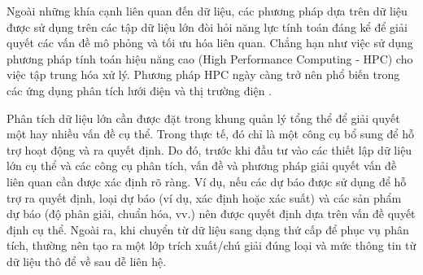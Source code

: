 \documentclass[utf8]{frontiersSCNS} %
\begin{document}
Ngoài những khía cạnh liên quan đến dữ liệu, các phương pháp dựa trên dữ liệu được sử dụng trên các tập dữ liệu lớn đòi hỏi năng lực tính toán đáng kể để giải quyết các vấn đề mô phỏng và tối ưu hóa liên quan. Chẳng hạn như việc sử dụng phương pháp tính toán hiệu năng cao  (High Performance Computing - HPC) cho việc tập trung hóa xử lý. Phương pháp HPC ngày càng trở nên phổ biến trong các ứng dụng phân tích lưới điện và thị trường điện \citep{Khaitan2012}. %

Phân tích dữ liệu lớn cần được đặt trong khung quản lý tổng thể để giải quyết một hay nhiều vấn đề cụ thể. Trong thực tế, đó chỉ là một công cụ bổ sung để hỗ trợ hoạt động và ra quyết định. Do đó, trước khi đầu tư vào các thiết lập dữ liệu lớn cụ thể và các công cụ phân tích, vấn đề và phương pháp giải quyết vấn đề liên quan cần được xác định rõ ràng. Ví dụ, nếu các dự báo được sử dụng để hỗ trợ ra quyết định, loại dự báo (ví dụ, xác định hoặc xác suất) và các sản phẩm dự báo (độ phân giải, chuẩn hóa, vv.) nên được quyết định dựa trên vấn đề quyết định cụ thể. Ngoài ra, khi chuyển từ dữ liệu sang dạng thứ cấp để phục vụ phân tích, thường nên tạo ra một lớp trích xuất/chú giải đúng loại và mức thông tin từ dữ liệu thô để về sau dễ liên hệ. %
\end{document}
